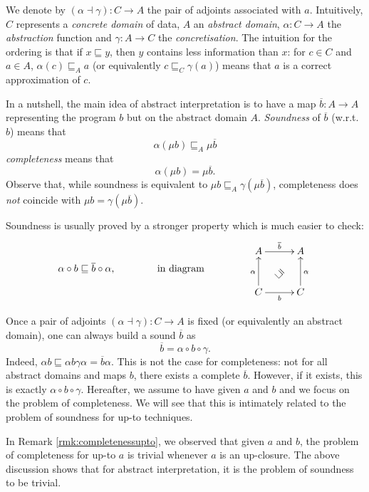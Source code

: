 \documentclass[smallcondensed,envcountsect,envcountsame]{svjour3}     %
\begin{document}
We denote by $(\alpha \dashv \gamma) \colon C \to A$ the pair of adjoints associated with $a$. Intuitively, $C$ represents a \emph{concrete domain} of data, $A$ an \emph{abstract domain}, $\alpha\colon C \to A$  the \emph{abstraction} function and $\gamma \colon A \to C$ the \emph{concretisation}. The intuition for the ordering is that if $x\sqsubseteq y$, then $y$ contains less information than $x$: for $c\in C$ and $a\in A$, $\alpha(c)\sqsubseteq_A a$ (or equivalently $c\sqsubseteq_C \gamma (a)$) means that $a$ is a correct approximation of $c$. 

In a nutshell, the main idea of abstract interpretation is to have a map $\overline{b}\colon A\to A$ representing the program $b$ but on the abstract domain $A$. \emph{Soundness} of $\overline{b}$ (w.r.t. $b$) means that
$$\alpha(\mu b) \sqsubseteq_A \mu \overline{b}$$
\emph{completeness} means that
\begin{equation}\alpha(\mu b) = \mu \overline{b}\text{.}\end{equation}
Observe that, while soundness is equivalent to $\mu b \sqsubseteq_A \gamma (\mu \overline{b})$, completeness does \emph{not} coincide with  $\mu b = \gamma (\mu \overline{b})$.


Soundness is usually proved by a stronger property which is much easier to check:
$$
\alpha \circ b \sqsubseteq \overline{b} \circ \alpha\text{,} \qquad \qquad \text{ in diagram } \qquad \qquad
{\lower-0.7cm\hbox{\xymatrix@R=0.2cm@C=0.2cm{A \ar[rr]^{\overline{b}} & & A\\ 
& \rotatebox{135}{$\sqsubseteq$} \\
C \ar[rr]_b \ar[uu]^\alpha & &  C \ar[uu]_\alpha
} } }$$



Once a pair of adjoints $(\alpha \dashv \gamma) \colon C \to A$ is fixed (or equivalently an abstract domain), one can always build a sound $\overline{b}$ as
$$ \overline{b} = \alpha \circ b \circ \gamma \text{.}$$
Indeed, $\alpha b \sqsubseteq \alpha b \gamma \alpha = \overline{b} \alpha$. This is not the case for completeness: not for all abstract domains and maps $b$, there exists a complete $\overline{b}$. However, if it exists, this is exactly $\alpha \circ b \circ \gamma$. Hereafter, we assume to have given $a$ and $b$ and we focus on the problem of completeness. We will see that this is intimately related to the problem of soundness for up-to techniques.

\begin{remark}
In Remark \ref{rmk:completenessupto}, we observed that given $a$ and $b$, the problem of completeness for up-to $a$ is trivial whenever $a$ is an up-closure. The above discussion shows that for abstract interpretation, it is the problem of soundness to be trivial.
\end{remark}
\end{document}
